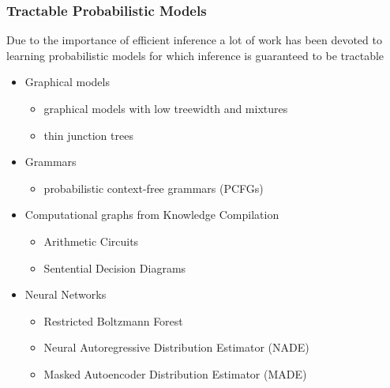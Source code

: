 \documentclass[10pt, t, xcolor={usenames,dvipsnames,svgnames}, compress]{beamer}
\begin{document}
\begin{frame}
  \frametitle{Tractable Probabilistic Models}
Due to the importance of efficient inference a lot of work has been devoted to
learning probabilistic models for which inference is guaranteed to be tractable 
\begin{itemize}
\item Graphical models
  \begin{itemize}
  \item  graphical models with low treewidth and mixtures
  \item thin junction trees
  \end{itemize}
\item Grammars
  \begin{itemize}
  \item probabilistic context-free grammars (PCFGs)
  \end{itemize}
\item Computational graphs from Knowledge Compilation
\begin{itemize}
\item Arithmetic Circuits
\item Sentential Decision Diagrams
\end{itemize}
\item Neural Networks
\begin{itemize}
\item Restricted Boltzmann Forest 
\item Neural Autoregressive Distribution Estimator (NADE)
\item Masked Autoencoder Distribution Estimator (MADE)
\end{itemize}
\end{itemize}
\end{frame}
\end{document}
